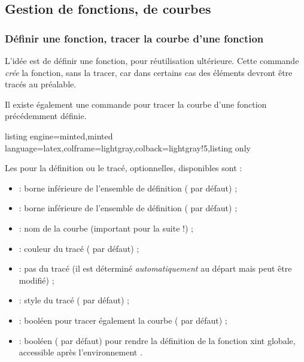\documentclass[11pt,a4paper]{ltxdoc}
\begin{document}
\pagebreak

\subsection{Gestion de fonctions, de courbes}

\subsubsection{Définir une fonction, tracer la courbe d'une fonction}\label{deftracfct}

L'idée est de définir une fonction, pour réutilisation ultérieure. Cette commande \textit{crée} la fonction, sans la tracer, car dans certains cas des éléments devront être tracés au préalable.

\smallskip

Il existe également une commande pour tracer la courbe d'une fonction précédemment définie.

\begin{tcblisting}{listing engine=minted,minted language=latex,colframe=lightgray,colback=lightgray!5,listing only}
\end{tcblisting}

Les \MontreCode{[clés]} pour la définition ou le tracé, optionnelles, disponibles sont :

\smallskip

\begin{itemize}
  \item {} : borne inférieure de l'ensemble de définition ( par défaut) ;
  \item {} : borne inférieure de l'ensemble de définition ( par défaut) ;
  \item {} : nom de la courbe (important pour la suite !) ;
  \item {} : couleur du tracé ( par défaut) ;
  \item {} : pas du tracé (il est déterminé \textit{automatiquement} au départ mais peut être modifié) ;
  \item {} : style du tracé ( par défaut) ;
  \item {} : booléen pour tracer également la courbe ( par défaut) ;
  \item {} : booléen ( par défaut)
  pour rendre la définition de la fonction \textsf{xint} globale,
  accessible après l'environnement .
\end{itemize}
\end{document}

